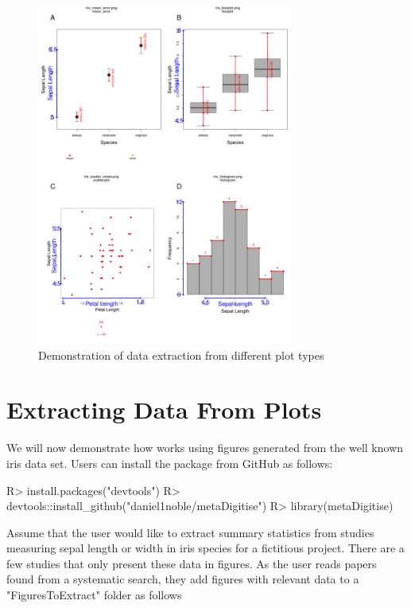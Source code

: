\documentclass[article]{jss}
\newcommand{\fct}[1]{\code{#1()}}
\begin{document}
\begin{figure}[!h]
\centering 
 \includegraphics[width=0.75\textwidth]{fig_all_extract.pdf} 
 \caption{Demonstration of data extraction from different plot types}
\label{fig:all_extract}
\end{figure}




\section{Extracting Data From Plots}


We will now demonstrate how \fct{metaDigitise} works using figures generated from the well known iris data set. Users can install the  package from GitHub as follows:

\begin{CodeChunk}
\begin{CodeInput}
R> install.packages("devtools")
R> devtools::install_github("daniel1noble/metaDigitise")
R> library(metaDigitise)
\end{CodeInput}
\end{CodeChunk}

Assume that the user would like to extract summary statistics from studies measuring sepal length or width in iris species for a fictitious project. There are a few studies that only present these data in figures. As the user reads papers found from a systematic search, they add figures with relevant data to a "FiguresToExtract" folder as follows
\end{document}
